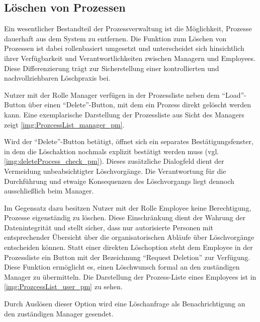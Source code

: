 
\newpage
\subsection*{Löschen von Prozessen}
Ein wesentlicher Bestandteil der Prozessverwaltung ist die Möglichkeit, Prozesse dauerhaft aus dem System zu entfernen. Die Funktion zum Löschen von Prozessen ist dabei rollenbasiert umgesetzt und unterscheidet sich hinsichtlich ihrer Verfügbarkeit und Verantwortlichkeiten zwischen Managern und Employees. Diese Differenzierung trägt zur Sicherstellung einer kontrollierten und nachvollziehbaren Löschpraxis bei.

Nutzer mit der Rolle Manager verfügen in der Prozessliste neben dem \enquote{Load}-Button über einen \enquote{Delete}-Button, mit dem ein Prozess direkt gelöscht werden kann. Eine exemplarische Darstellung der Prozessliste aus Sicht des Managers zeigt \autoref{img:ProzcessList_manager_pm}.


Wird der \enquote{Delete}-Button betätigt, öffnet sich ein separates Bestätigungsfenster, in dem die Löschaktion nochmals explizit bestätigt werden muss (vgl. \autoref{img:deleteProcess_check_pm}). Dieses zusätzliche Dialogfeld dient der Vermeidung unbeabsichtigter Löschvorgänge. Die Verantwortung für die Durchführung und etwaige Konsequenzen des Löschvorgangs liegt dennoch ausschließlich beim Manager.


Im Gegensatz dazu besitzen Nutzer mit der Rolle Employee keine Berechtigung, Prozesse eigenständig zu löschen. Diese Einschränkung dient der Wahrung der Datenintegrität und stellt sicher, dass nur autorisierte Personen mit entsprechender Übersicht über die organisatorischen Abläufe über Löschvorgänge entscheiden können. Statt einer direkten Löschoption steht dem Employee in der Prozessliste ein Button mit der Bezeichnung \enquote{Request Deletion} zur Verfügung. Diese Funktion ermöglicht es, einen Löschwunsch formal an den zuständigen Manager zu übermitteln. Die Darstellung der Prozess-Liste eines Employees ist in \autoref{img:ProzcessList_user_pm} zu sehen.

\newpage
{}

Durch Auslösen dieser Option wird eine Löschanfrage als Benachrichtigung an den zuständigen Manager gesendet.

